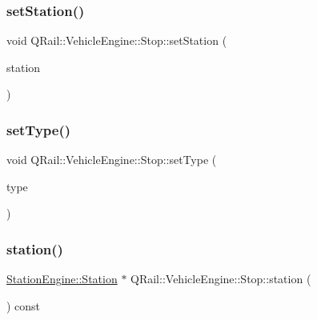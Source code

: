 \subsubsection{\texorpdfstring{setStation()}{setStation()}}
{\footnotesize\ttfamily void Q\+Rail\+::\+Vehicle\+Engine\+::\+Stop\+::set\+Station (\begin{DoxyParamCaption}\item[{\mbox{\hyperlink{classQRail_1_1StationEngine_1_1Station}{Station\+Engine\+::\+Station}} $\ast$}]{station }\end{DoxyParamCaption})}

\mbox{\label{classQRail_1_1VehicleEngine_1_1Stop_a6312361e41e4fcf40f509a008cee3361}} 
\subsubsection{\texorpdfstring{setType()}{setType()}}
{\footnotesize\ttfamily void Q\+Rail\+::\+Vehicle\+Engine\+::\+Stop\+::set\+Type (\begin{DoxyParamCaption}\item[{const \mbox{\hyperlink{classQRail_1_1VehicleEngine_1_1Stop_af078938bc06ff906b6fc843d8c0206fa}{Q\+Rail\+::\+Vehicle\+Engine\+::\+Stop\+::\+Type}} \&}]{type }\end{DoxyParamCaption})}

\mbox{\label{classQRail_1_1VehicleEngine_1_1Stop_a9a481db5e15c322b04f4b2857d6f210e}} 
\subsubsection{\texorpdfstring{station()}{station()}}
{\footnotesize\ttfamily \mbox{\hyperlink{classQRail_1_1StationEngine_1_1Station}{Station\+Engine\+::\+Station}} $\ast$ Q\+Rail\+::\+Vehicle\+Engine\+::\+Stop\+::station (\begin{DoxyParamCaption}{ }\end{DoxyParamCaption}) const}

\mbox{\label{classQRail_1_1VehicleEngine_1_1Stop_a1258c85863b7b97abaf17cfb8e501291}} 
